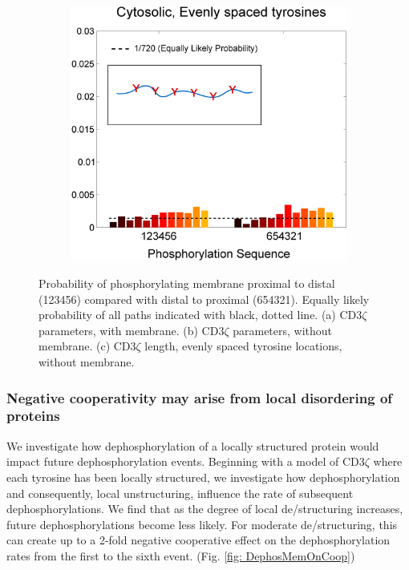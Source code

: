 \documentclass[../../AdvancementSummary.tex]{subfiles}
\begin{document}
\begin{figure}[H]
\begin{center}
\begin{subfigure}{0.3\linewidth}
			\caption{}
		\end{subfigure}
		\begin{subfigure}{0.3\linewidth}
			\includegraphics[width=\linewidth]{ResultsFigures/StiffeningSequentialBinding/EvenSites/ProbVSSequence.eps}
			\caption{}
		\end{subfigure}
	\end{center}
	\caption{Probability of phosphorylating membrane proximal to distal (123456) compared with distal to proximal (654321). Equally likely probability of all paths indicated with black, dotted line. (a) CD3$\zeta$ parameters, with membrane. (b) CD3$\zeta$ parameters, without membrane. (c) CD3$\zeta$ length, evenly spaced tyrosine locations, without membrane. \label{fig: StiffeningSeqBind}}
\end{figure}

\subsubsection{Negative cooperativity may arise from local disordering of proteins}

We investigate how dephosphorylation of a locally structured protein would impact future dephosphorylation events. Beginning with a model of CD3$\zeta$ where each tyrosine has been locally structured, we investigate how dephosphorylation and consequently, local unstructuring, influence the rate of subsequent dephosphorylations. We find that as the degree of local de/structuring increases, future dephosphorylations become less likely. For moderate de/structuring, this can create up to a 2-fold negative cooperative effect on the dephosphorylation rates from the first to the sixth event. (Fig. \ref{fig: DephosMemOnCoop})
\end{document}
